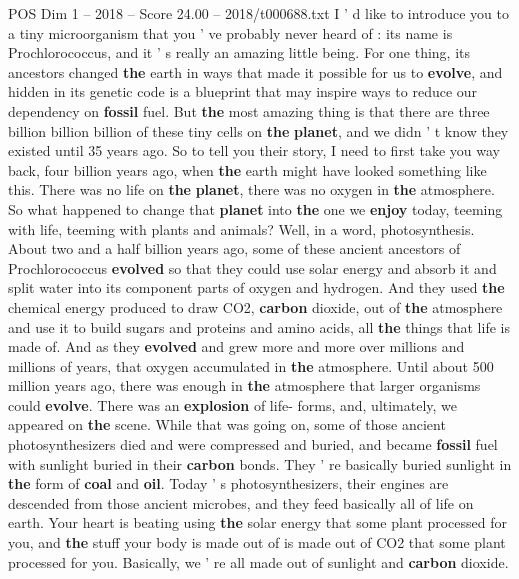 \begin{textsample}{POS Dim 1 – 2018 – Score 24.00 – 2018/t000688.txt}  \label{ex:f1_pos_066}
I ' d like to introduce you to a tiny microorganism that you ' ve probably never heard of : its name is Prochlorococcus, and it ' s really an amazing little being.
For one thing, its ancestors changed \textbf{the} earth in ways that made it possible for us to \textbf{evolve}, and hidden in its genetic code is a blueprint that may inspire ways to reduce our dependency on \textbf{fossil} fuel.
But \textbf{the} most amazing thing is that there are three billion billion billion of these tiny cells on \textbf{the} \textbf{planet}, and we didn ' t know they existed until 35 years ago.
So to tell you their story, I need to first take you way back, four billion years ago, when \textbf{the} earth might have looked something like this.
There was no life on \textbf{the} \textbf{planet}, there was no oxygen in \textbf{the} atmosphere.
So what happened to change that \textbf{planet} into \textbf{the} one we \textbf{enjoy} today, teeming with life, teeming with plants and animals?
Well, in a word, photosynthesis.
About two and a half billion years ago, some of these ancient ancestors of Prochlorococcus \textbf{evolved} so that they could use solar energy and absorb it and split water into its component parts of oxygen and hydrogen.
And they used \textbf{the} chemical energy produced to draw CO2, \textbf{carbon} dioxide, out of \textbf{the} atmosphere and use it to build sugars and proteins and amino acids, all \textbf{the} things that life is made of.
And as they \textbf{evolved} and grew more and more over millions and millions of years, that oxygen accumulated in \textbf{the} atmosphere.
Until about 500 million years ago, there was enough in \textbf{the} atmosphere that larger organisms could \textbf{evolve}.
There was an \textbf{explosion} of life- forms, and, ultimately, we appeared on \textbf{the} scene.
While that was going on, some of those ancient photosynthesizers died and were compressed and buried, and became \textbf{fossil} fuel with sunlight buried in their \textbf{carbon} bonds.
They ' re basically buried sunlight in \textbf{the} form of \textbf{coal} and \textbf{oil}.
Today ' s photosynthesizers, their engines are descended from those ancient microbes, and they feed basically all of life on earth.
Your heart is beating using \textbf{the} solar energy that some plant processed for you, and \textbf{the} stuff your body is made out of is made out of CO2 that some plant processed for you.
Basically, we ' re all made out of sunlight and \textbf{carbon} dioxide.

\end{textsample}
